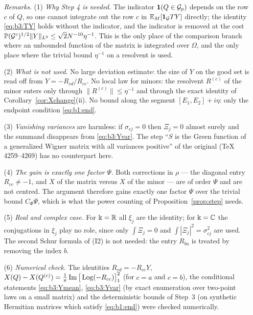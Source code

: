 \noindent\emph{Remarks.} (1) \emph{Why Step 4 is needed.} The indicator $\mathbf 1(Q\in\mathcal{G}_p)$ depends on the row $c$ of $Q$, so one cannot integrate out the row $c$ in $\mathbb{E}_M[\mathbf 1_{\mathcal{G}}TY]$ directly;
the identity \eqref{eq:b3:TY} holds without the indicator, and the indicator is removed at the cost $\mathbb{P}(\mathcal{G}^c)^{1/2}\|Y\|_{L^2}\le\sqrt2N^{-10}\eta^{-1}$. This is the only place of the comparison branch where an
unbounded function of the matrix is integrated over $\Omega$, and the only place where the trivial bound $\eta^{-1}$ on a resolvent is used.

(2) \emph{What is not used.} No large deviation estimate: the size of $Y$ on the good set is read off from $Y=-R_{cd}/R_{cc}$. No local law for minors: the resolvent $R^{(c)}$ of the minor enters only through
$\|R^{(c)}\|\le\eta^{-1}$ and through the exact identity of Corollary~\ref{cor:Xchange}(ii). No bound along the segment $[E_1,E_2]+i\eta$: only the endpoint condition \eqref{eq:b1:end}.

(3) \emph{Vanishing variances} are harmless: if $\sigma_{cj}=0$ then $\Xi_j=0$ almost surely and the summand disappears from \eqref{eq:b3:Yvar}. The step ``$S$ is the Green function of a generalized Wigner matrix
with all variances positive'' of the original (TeX 4259--4269) has no counterpart here.

(4) \emph{The gain is exactly one factor $\Psi$.} Both corrections in $\rho$ --- the diagonal entry $R_{cc}\ne-1$, and $X$ of the matrix versus $X$ of the minor --- are of order $\Psi$ and are not centred. The argument
therefore gains exactly one factor $\Psi$ over the trivial bound $C_\Phi\Psi$, which is what the power counting of Proposition~\ref{prop:step} needs.

(5) \emph{Real and complex case.} For $\Bbbk=\mathbb{R}$ all $\xi_j$ are the identity; for $\Bbbk=\mathbb{C}$ the conjugations in $\xi_j$ play no role, since only $\int\Xi_j=0$ and $\int|\Xi_j|^2=\sigma_{cj}^2$ are used.
The second Schur formula of \textup{(I2)} is not needed: the entry $R_{ba}$ is treated by removing the index $b$.

(6) \emph{Numerical check.} The identities $R_{cd}=-R_{cc}Y$, $X(Q)-X(Q^{(c)})=\frac1\pi\operatorname{Im}\big[\operatorname{Log}(-R_{cc})\big]_{1}^{2}$ (for $c=a$ and $c=b$), the conditional statements \eqref{eq:b3:Ymean}, \eqref{eq:b3:Yvar}
(by exact enumeration over two-point laws on a small matrix) and the deterministic bounds of Step~3 (on synthetic Hermitian matrices which satisfy \eqref{eq:b1:end}) were checked numerically.

